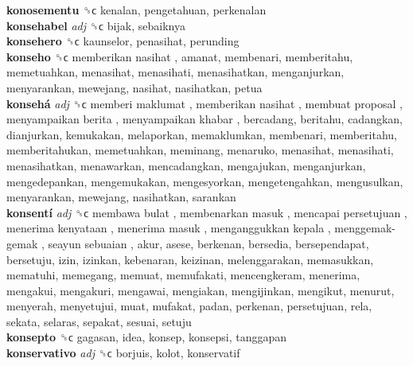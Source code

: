 \textbf{konosementu} ␝ϲ  kenalan, pengetahuan, perkenalan  \\
\textbf{konsehabel} \emph{adj}  ␝ϲ  bijak, sebaiknya  \\
\textbf{konsehero} ␝ϲ  kaunselor, penasihat, perunding  \\
\textbf{konseho} ␝ϲ   memberikan nasihat , amanat, membenari, memberitahu, memetuahkan, menasihat, menasihati, menasihatkan, menganjurkan, menyarankan, mewejang, nasihat, nasihatkan, petua  \\
\textbf{konsehá} \emph{adj}  ␝ϲ   memberi maklumat ,  memberikan nasihat ,  membuat proposal ,  menyampaikan berita ,  menyampaikan khabar , bercadang, beritahu, cadangkan, dianjurkan, kemukakan, melaporkan, memaklumkan, membenari, memberitahu, memberitahukan, memetuahkan, meminang, menaruko, menasihat, menasihati, menasihatkan, menawarkan, mencadangkan, mengajukan, menganjurkan, mengedepankan, mengemukakan, mengesyorkan, mengetengahkan, mengusulkan, menyarankan, mewejang, nasihatkan, sarankan  \\
\textbf{konsentí} \emph{adj}  ␝ϲ   membawa bulat ,  membenarkan masuk ,  mencapai persetujuan ,  menerima kenyataan ,  menerima masuk ,  menganggukkan kepala ,  menggemak-gemak ,  seayun sebuaian , akur, asese, berkenan, bersedia, bersependapat, bersetuju, izin, izinkan, kebenaran, keizinan, melenggarakan, memasukkan, mematuhi, memegang, memuat, memufakati, mencengkeram, menerima, mengakui, mengakuri, mengawai, mengiakan, mengijinkan, mengikut, menurut, menyerah, menyetujui, muat, mufakat, padan, perkenan, persetujuan, rela, sekata, selaras, sepakat, sesuai, setuju  \\
\textbf{konsepto} ␝ϲ  gagasan, idea, konsep, konsepsi, tanggapan  \\
\textbf{konservativo} \emph{adj}  ␝ϲ  borjuis, kolot, konservatif  \\
